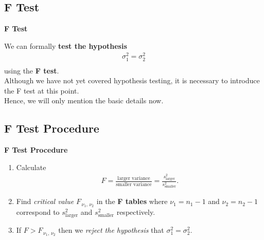 \documentclass[compress]{beamer}        %
\makeatletter
\newcommand{\tcb}{\textcolor{beamer@blendedblue}}
\makeatother
\begin{document}
\subsection{F Test}
\begin{frame}{\bf \tcb{F Test}}

We can formally {\bf test the hypothesis}\\
\begin{align*}
\boxed{\sigma_1^2 = \sigma_2^2}\\[-0.3cm]
\end{align*}
using the {\bf F test}.\\[1cm]

Although we have not yet covered hypothesis testing, it is necessary to introduce the F test at this point.\\[0.6cm]

Hence, we will only mention the basic details now.

\end{frame}

\subsection{F Test Procedure}
\begin{frame}{\bf \tcb{F Test Procedure}}

\begin{enumerate}[1.]\itemsep1.4cm
\item Calculate \\[-1.6cm]
\begin{align*}
\boxed{F  = \frac{\text{larger variance}}{\text{smaller variance}} = \frac{s^2_{\text{larger}}}{s^2_{\text{smaller}}}}.
\end{align*}
\item Find \emph{critical value} $F_{\,\nu_1,\,\nu_2}$ in the {\bf F tables} where $\nu_1=n_1-1$ and $\nu_2=n_2-1$ correspond to $s^2_{\text{larger}}$ and $s^2_{\text{smaller}}$ respectively.
\item If $F > F_{\,\nu_1,\,\nu_2}$ then we \emph{reject the hypothesis} that $\sigma_1^2 = \sigma_2^2$.
\end{enumerate}

\end{frame}
\end{document}
